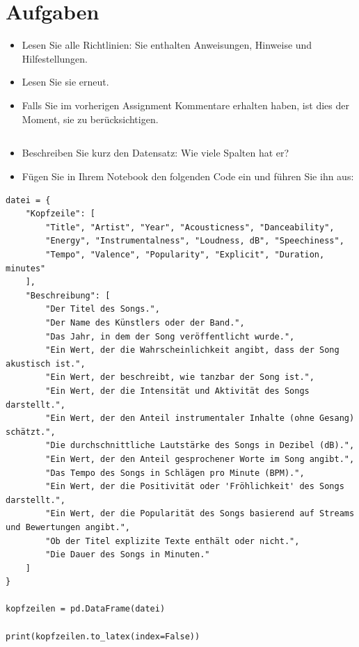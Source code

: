 \documentclass[
	german,
	accentcolor=9c,%
	type=intern,
	marginpar=false
	]{tudapub}
\begin{document}
\clearpage

\section{Aufgaben}       %

\begin{itemize}
\item Lesen Sie alle Richtlinien: Sie enthalten Anweisungen, Hinweise und Hilfestellungen. 
\item Lesen Sie sie erneut.
\item Falls Sie im vorherigen Assignment Kommentare erhalten haben, ist dies der Moment, sie zu berücksichtigen.
\end{itemize}

\subsection{}
\begin{itemize}
\item Beschreiben Sie kurz den Datensatz: Wie viele Spalten hat er?
\item Fügen Sie in Ihrem Notebook den folgenden Code ein und führen Sie ihn aus:
\end{itemize}

\begin{verbatim}
datei = {
    "Kopfzeile": [
        "Title", "Artist", "Year", "Acousticness", "Danceability", 
        "Energy", "Instrumentalness", "Loudness, dB", "Speechiness", 
        "Tempo", "Valence", "Popularity", "Explicit", "Duration, minutes"
    ],
    "Beschreibung": [
        "Der Titel des Songs.", 
        "Der Name des Künstlers oder der Band.",
        "Das Jahr, in dem der Song veröffentlicht wurde.",
        "Ein Wert, der die Wahrscheinlichkeit angibt, dass der Song akustisch ist.",
        "Ein Wert, der beschreibt, wie tanzbar der Song ist.",
        "Ein Wert, der die Intensität und Aktivität des Songs darstellt.",
        "Ein Wert, der den Anteil instrumentaler Inhalte (ohne Gesang) schätzt.",
        "Die durchschnittliche Lautstärke des Songs in Dezibel (dB).",
        "Ein Wert, der den Anteil gesprochener Worte im Song angibt.",
        "Das Tempo des Songs in Schlägen pro Minute (BPM).",
        "Ein Wert, der die Positivität oder 'Fröhlichkeit' des Songs darstellt.",
        "Ein Wert, der die Popularität des Songs basierend auf Streams und Bewertungen angibt.",
        "Ob der Titel explizite Texte enthält oder nicht.",
        "Die Dauer des Songs in Minuten."
    ]
}

kopfzeilen = pd.DataFrame(datei)

print(kopfzeilen.to_latex(index=False))
\end{verbatim}
\end{document}
